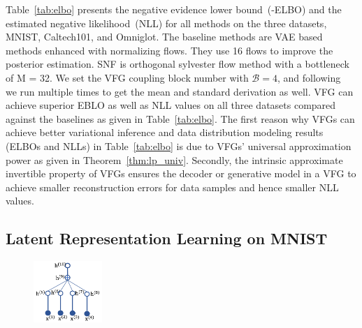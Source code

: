 \documentclass[sigconf, anonymous, review]{acmart}
\theoremstyle{plain}
\theoremstyle{definition}
\theoremstyle{remark}
\begin{document}
Table~\ref{tab:elbo} presents the negative evidence lower bound~(-ELBO) and the estimated negative likelihood~(NLL) for all methods on the three datasets, MNIST, Caltech101, and Omniglot.  The baseline methods are VAE based methods  enhanced with  normalizing flows.  They use 16 flows to improve the posterior estimation. SNF is orthogonal sylvester flow method with a bottleneck of M = 32. We set the VFG coupling block\cite{Dinh2016DensityEU} number with  $\mathcal{B}=4$, and following~\cite{berg2018sylvester} we run multiple times to get the mean and standard derivation as well. VFG can achieve superior EBLO as well as NLL values on all three datasets compared against  the baselines as given in Table~\ref{tab:elbo}. The first reason  why VFGs can achieve better variational inference and data distribution modeling results (ELBOs and  NLLs) in Table~\ref{tab:elbo} is due to VFGs' universal approximation power as given in Theorem~\ref{thm:lp_univ}. Secondly, the intrinsic  approximate invertible property of VFGs ensures the decoder or generative model in a VFG to achieve smaller reconstruction errors for data samples and hence smaller NLL values.

\subsection{Latent Representation Learning on MNIST}\label{sec:exp:mnist}

\begin{figure}
\centering
       \includegraphics[width=0.23\textwidth]{fig/tree_mnist.png}
    \label{fig:mnist_tree}
\vspace{-0.15in}
\end{figure}
\end{document}
